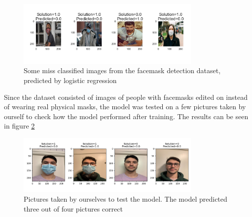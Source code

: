 \documentclass[../main.tex]{subfiles}
\begin{document}
\begin{figure}[H]
    \centering
    \includegraphics[width=0.8\textwidth]{assets/logreg_missclassified_facemask.png}
    \caption{Some miss classified images from the facemask detection dataset, predicted by logistic regression}
    \label{fig:missclassified_logreg_facemask}
\end{figure}


Since the dataset consisted of images of people with facemasks edited on instead of wearing real physical masks, the model was tested on a few pictures taken by ourself to check how the model performed after training. The results can be seen in figure \ref{fig:logreg_real_pics}

\begin{figure}[H]
    \centering
    \includegraphics[width=0.8\textwidth]{assets/log_reg_real_pics.png}
    \caption{Pictures taken by ourselves to test the model. The model predicted three out of four pictures correct}
    \label{fig:logreg_real_pics}
\end{figure}
\end{document}
